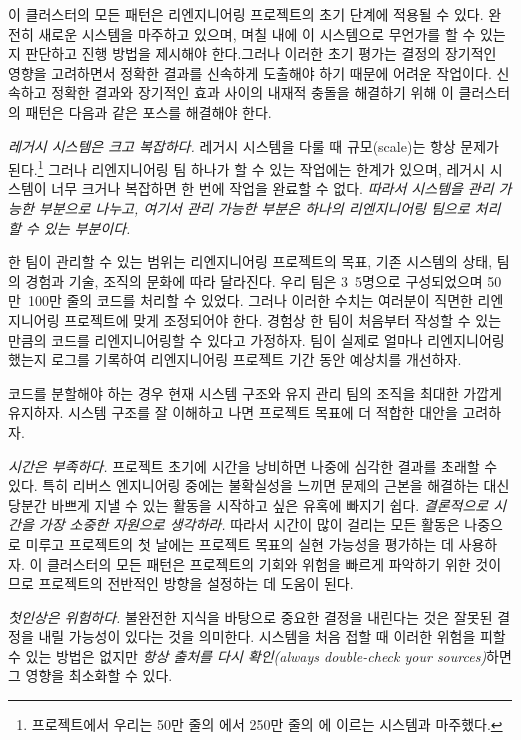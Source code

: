 \documentclass[a4paper,10pt,twoside]{book}
\begin{document}
이 클러스터의 모든 패턴은 리엔지니어링 프로젝트의 초기 단계에 적용될 수 있다. 완전히 새로운 시스템을 마주하고 있으며, 며칠 내에 이 시스템으로 무언가를 할 수 있는지 판단하고 진행 방법을 제시해야 한다.그러나 이러한 초기 평가는 결정의 장기적인 영향을 고려하면서 정확한 결과를 신속하게 도출해야 하기 때문에 어려운 작업이다. 신속하고 정확한 결과와 장기적인 효과 사이의 내재적 충돌을 해결하기 위해 이 클러스터의 패턴은 다음과 같은 포스를 해결해야 한다.

\begin{bulletlist}
  \item \emph{레거시 시스템은 크고 복잡하다.}
레거시 시스템을 다룰 때 규모(scale)는 항상 문제가 된다.\footnote{ 프로젝트에서 우리는 50만 줄의 에서 250만 줄의 에 이르는 시스템과 마주했다.}
그러나 리엔지니어링 팀 하나가 할 수 있는 작업에는 한계가 있으며, 레거시 시스템이 너무 크거나 복잡하면 한 번에 작업을 완료할 수 없다.
\emph{따라서 시스템을 관리 가능한 부분으로 나누고, 여기서 관리 가능한 부분은 하나의 리엔지니어링 팀으로 처리할 수 있는 부분이다.}

한 팀이 관리할 수 있는 범위는 리엔지니어링 프로젝트의 목표, 기존 시스템의 상태, 팀의 경험과 기술, 조직의 문화에 따라 달라진다. 우리 팀은 3~5명으로 구성되었으며 50만~100만 줄의 코드를 처리할 수 있었다. 그러나 이러한 수치는 여러분이 직면한 리엔지니어링 프로젝트에 맞게 조정되어야 한다. 경험상 한 팀이 처음부터 작성할 수 있는 만큼의 코드를 리엔지니어링할 수 있다고 가정하자. 팀이 실제로 얼마나 리엔지니어링했는지 로그를 기록하여 리엔지니어링 프로젝트 기간 동안 예상치를 개선하자.

코드를 분할해야 하는 경우 현재 시스템 구조와 유지 관리 팀의 조직을 최대한 가깝게 유지하자. 시스템 구조를 잘 이해하고 나면 프로젝트 목표에 더 적합한 대안을 고려하자.

  \item \emph{시간은 부족하다.}
프로젝트 초기에 시간을 낭비하면 나중에 심각한 결과를 초래할 수 있다. 특히 리버스 엔지니어링 중에는 불확실성을 느끼면 문제의 근본을 해결하는 대신 당분간 바쁘게 지낼 수 있는 활동을 시작하고 싶은 유혹에 빠지기 쉽다. \emph{결론적으로 시간을 가장 소중한 자원으로 생각하라.} 따라서 시간이 많이 걸리는 모든 활동은 나중으로 미루고 프로젝트의 첫 날에는 프로젝트 목표의 실현 가능성을 평가하는 데 사용하자. 이 클러스터의 모든 패턴은 프로젝트의 기회와 위험을 빠르게 파악하기 위한 것이므로 프로젝트의 전반적인 방향을 설정하는 데 도움이 된다.

  \item \emph{첫인상은 위험하다.}
불완전한 지식을 바탕으로 중요한 결정을 내린다는 것은 잘못된 결정을 내릴 가능성이 있다는 것을 의미한다. 시스템을 처음 접할 때 이러한 위험을 피할 수 있는 방법은 없지만 \emph{항상 출처를 다시 확인(always double-check your sources)}하면 그 영향을 최소화할 수 있다.


\end{bulletlist}
\end{document}
